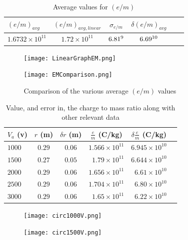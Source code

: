 \documentclass[prb,preprint]{revtex4-1}
\begin{document}
	\begin{table}[h!]
		\centering
		\caption{Average values for $(e/m)$}
		\begin{ruledtabular}
		\begin{tabular}{l c c c c p{5cm}}
		$(e/m)_{avg}$ & $(e/m)_{avg,linear}$ & $\sigma_{e/m}$ & $\delta (e/m)_{avg}$\\
		\hline
		$1.6732\times10^11$ & $1.72\times10^{11}$ & $6.81\time10^{9}$ & $6.69\time10^{10}$\\
		\end{tabular}
		\end{ruledtabular}
		\label{e/mavgs}
	\end{table}

	\begin{figure}[h]
		\centering
		\begin{minipage}{.5\textwidth}
			\texttt{[image: LinearGraphEM.png]}
		\end{minipage}%
		\begin{minipage}{.5\textwidth}
			\texttt{[image: EMComparison.png]}
		\end{minipage}
		\caption{Comparison of the various average $(e/m)$ values}
		\label{averages}
	\end{figure}

	\begin{table}[h!]
		\centering
		\caption{Value, and error in, the charge to mass ratio along with other relevant data}
		\begin{ruledtabular}
		\begin{tabular}{l c c c c p{5cm}}
		$V_a$ (v) & $r$ (m) & $\delta r$ (m) & $\frac{e}{m}$ (C/kg) & $\delta\frac{e}{m}$ (C/kg)\\
		\hline
		$1000$ & $0.29$ & $0.06$ & $1.566\times10^{11}$ & $6.945\times10^{10}$\\
		$1500$ & $0.27$ & $0.05$ & \ $1.79\times10^{11}$ & $6.644\times10^{10}$\\
		$2000$ & $0.29$ & $0.06$ & $1.656\times10^{11}$ & \ $6.61\times10^{10}$\\
		$2500$ & $0.29$ & $0.06$ & $1.704\times10^{11}$ & \ $6.80\times10^{10}$\\
		$3000$ & $0.29$ & $0.06$ & \ $1.65\times10^{11}$ & \ $6.22\times10^{10}$\\
		\end{tabular}
		\end{ruledtabular}
		\label{e/m by v}
	\end{table}
	
	\begin{figure}[h!]
		\centering
		\begin{minipage}{.5\textwidth}
			\texttt{[image: circ1000V.png]}
		\end{minipage}%
		\begin{minipage}{.5\textwidth}
			\texttt{[image: circ1500V.png]}
		\end{minipage}
	\end{figure}
	
\end{document}
